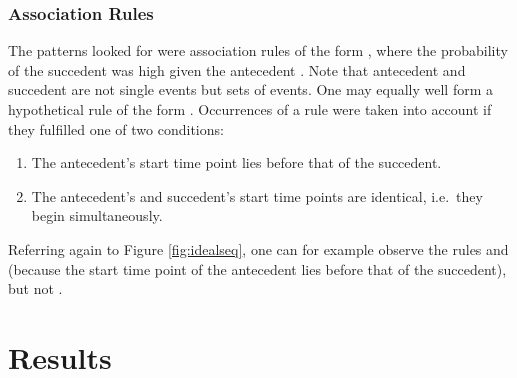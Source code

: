 \subsubsection{Association Rules}
The patterns  looked for were association rules of the form , where the probability of the succedent  was high given the antecedent . Note that antecedent and succedent are not single events but sets of events. One may equally well form a hypothetical rule of the form . Occurrences of a rule were taken into account if they fulfilled one of two conditions:

\begin{enumerate}
	\item The antecedent's start time point lies before that of the succedent.
	\item The antecedent's and succedent's start time points are identical, i.e.~they begin simultaneously.
\end{enumerate}

Referring again to Figure \ref{fig:idealseq}, one can for example observe the rules  and  (because the start time point of the antecedent lies before that of the succedent), but not .


\section{Results}

